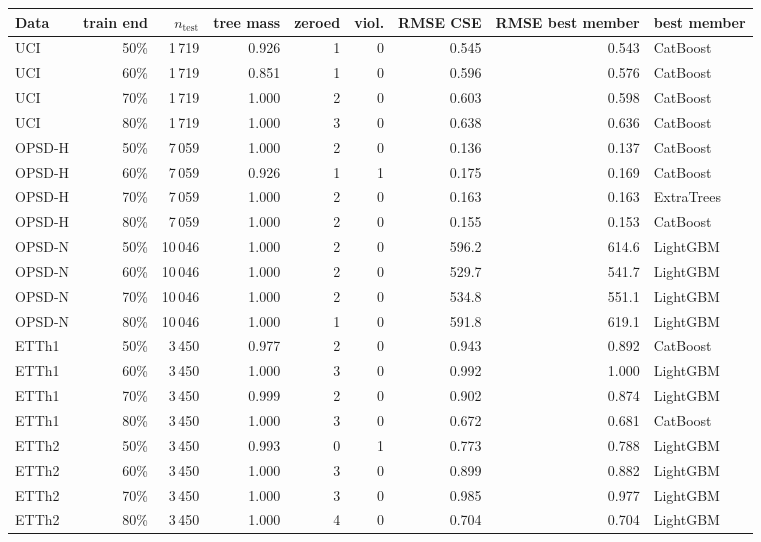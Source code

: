 \begin{tabular}{lrrrrrrrl}
\toprule
Data & train end & $n_{\mathrm{test}}$ & tree mass & zeroed & viol. & RMSE CSE & RMSE best member & best member \\
\midrule
UCI & 50\% & 1\,719 & 0.926 & 1 & 0 & 0.545 & 0.543 & CatBoost \\
UCI & 60\% & 1\,719 & 0.851 & 1 & 0 & 0.596 & 0.576 & CatBoost \\
UCI & 70\% & 1\,719 & 1.000 & 2 & 0 & 0.603 & 0.598 & CatBoost \\
UCI & 80\% & 1\,719 & 1.000 & 3 & 0 & 0.638 & 0.636 & CatBoost \\
OPSD-H & 50\% & 7\,059 & 1.000 & 2 & 0 & 0.136 & 0.137 & CatBoost \\
OPSD-H & 60\% & 7\,059 & 0.926 & 1 & 1 & 0.175 & 0.169 & CatBoost \\
OPSD-H & 70\% & 7\,059 & 1.000 & 2 & 0 & 0.163 & 0.163 & ExtraTrees \\
OPSD-H & 80\% & 7\,059 & 1.000 & 2 & 0 & 0.155 & 0.153 & CatBoost \\
OPSD-N & 50\% & 10\,046 & 1.000 & 2 & 0 & 596.2 & 614.6 & LightGBM \\
OPSD-N & 60\% & 10\,046 & 1.000 & 2 & 0 & 529.7 & 541.7 & LightGBM \\
OPSD-N & 70\% & 10\,046 & 1.000 & 2 & 0 & 534.8 & 551.1 & LightGBM \\
OPSD-N & 80\% & 10\,046 & 1.000 & 1 & 0 & 591.8 & 619.1 & LightGBM \\
ETTh1 & 50\% & 3\,450 & 0.977 & 2 & 0 & 0.943 & 0.892 & CatBoost \\
ETTh1 & 60\% & 3\,450 & 1.000 & 3 & 0 & 0.992 & 1.000 & LightGBM \\
ETTh1 & 70\% & 3\,450 & 0.999 & 2 & 0 & 0.902 & 0.874 & LightGBM \\
ETTh1 & 80\% & 3\,450 & 1.000 & 3 & 0 & 0.672 & 0.681 & CatBoost \\
ETTh2 & 50\% & 3\,450 & 0.993 & 0 & 1 & 0.773 & 0.788 & LightGBM \\
ETTh2 & 60\% & 3\,450 & 1.000 & 3 & 0 & 0.899 & 0.882 & LightGBM \\
ETTh2 & 70\% & 3\,450 & 1.000 & 3 & 0 & 0.985 & 0.977 & LightGBM \\
ETTh2 & 80\% & 3\,450 & 1.000 & 4 & 0 & 0.704 & 0.704 & LightGBM \\
\bottomrule
\end{tabular}
